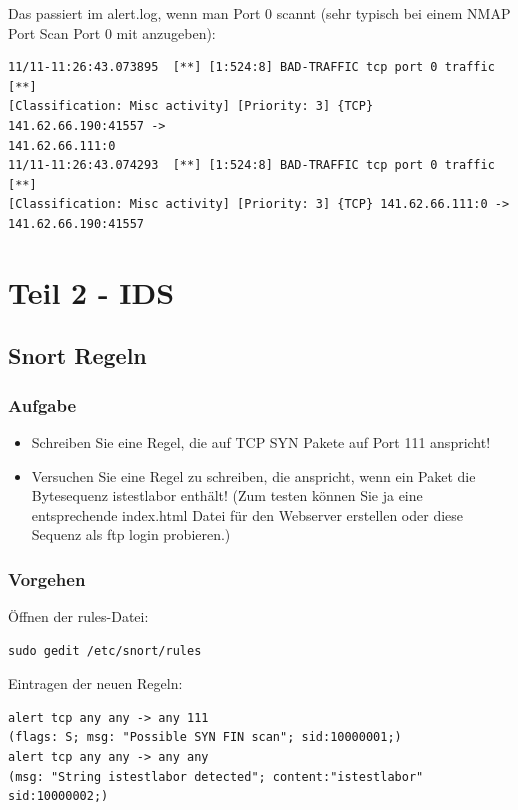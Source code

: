 \documentclass[a4paper]{report}
\begin{document}
Das passiert im alert.log, wenn man Port 0 scannt (sehr typisch bei einem NMAP Port Scan Port 0 mit anzugeben):
\begin{lstlisting}
11/11-11:26:43.073895  [**] [1:524:8] BAD-TRAFFIC tcp port 0 traffic [**]
[Classification: Misc activity] [Priority: 3] {TCP} 141.62.66.190:41557 ->
141.62.66.111:0
11/11-11:26:43.074293  [**] [1:524:8] BAD-TRAFFIC tcp port 0 traffic [**]
[Classification: Misc activity] [Priority: 3] {TCP} 141.62.66.111:0 ->
141.62.66.190:41557
\end{lstlisting}

\newpage
\section{Teil 2 - IDS}
	
\subsection{Snort Regeln}
\subsubsection{Aufgabe}
\begin{itemize}
\item Schreiben Sie eine Regel, die auf TCP SYN Pakete auf Port 111 anspricht!
\item Versuchen Sie eine Regel zu schreiben, die anspricht, wenn ein Paket die
Bytesequenz istestlabor enthält! (Zum testen können Sie ja eine entsprechende
index.html Datei für den Webserver erstellen oder diese Sequenz als ftp login
probieren.)
\end{itemize}
\subsubsection{Vorgehen}
Öffnen der rules-Datei:
\begin{lstlisting}
sudo gedit /etc/snort/rules
\end{lstlisting}
Eintragen der neuen Regeln:
\begin{lstlisting}
alert tcp any any -> any 111 
(flags: S; msg: "Possible SYN FIN scan"; sid:10000001;)
alert tcp any any -> any any
(msg: "String istestlabor detected"; content:"istestlabor" sid:10000002;)
\end{lstlisting}
\end{document}
